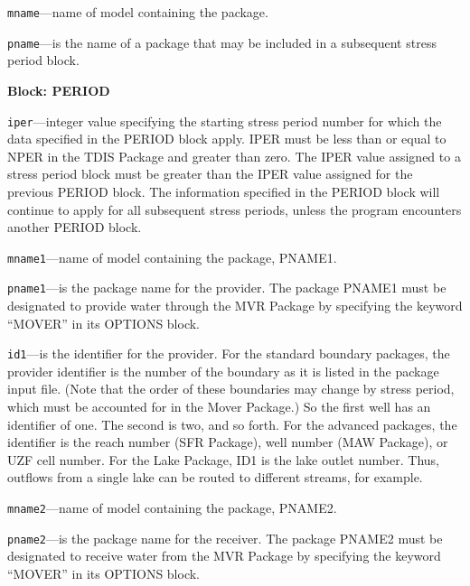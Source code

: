 \begin{description}
\item \texttt{mname}---name of model containing the package.

\item \texttt{pname}---is the name of a package that may be included in a subsequent stress period block.

\end{description}
\item \textbf{Block: PERIOD}

\begin{description}
\item \texttt{iper}---integer value specifying the starting stress period number for which the data specified in the PERIOD block apply.  IPER must be less than or equal to NPER in the TDIS Package and greater than zero.  The IPER value assigned to a stress period block must be greater than the IPER value assigned for the previous PERIOD block.  The information specified in the PERIOD block will continue to apply for all subsequent stress periods, unless the program encounters another PERIOD block.

\item \texttt{mname1}---name of model containing the package, PNAME1.

\item \texttt{pname1}---is the package name for the provider.  The package PNAME1 must be designated to provide water through the MVR Package by specifying the keyword ``MOVER'' in its OPTIONS block.

\item \texttt{id1}---is the identifier for the provider.  For the standard boundary packages, the provider identifier is the number of the boundary as it is listed in the package input file. (Note that the order of these boundaries may change by stress period, which must be accounted for in the Mover Package.)  So the first well has an identifier of one.  The second is two, and so forth.  For the advanced packages, the identifier is the reach number (SFR Package), well number (MAW Package), or UZF cell number.  For the Lake Package, ID1 is the lake outlet number.  Thus, outflows from a single lake can be routed to different streams, for example.

\item \texttt{mname2}---name of model containing the package, PNAME2.

\item \texttt{pname2}---is the package name for the receiver.  The package PNAME2 must be designated to receive water from the MVR Package by specifying the keyword ``MOVER'' in its OPTIONS block.


\end{description}

